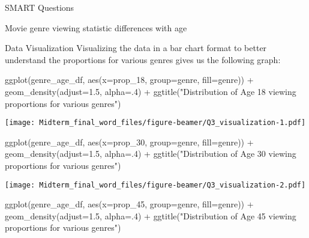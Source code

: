 \documentclass[
  ignorenonframetext,
]{beamer}
\newenvironment{Shaded}{\begin{snugshade}}{\end{snugshade}}
\newcommand{\AttributeTok}[1]{\textcolor[rgb]{0.77,0.63,0.00}{#1}}
\newcommand{\DecValTok}[1]{\textcolor[rgb]{0.00,0.00,0.81}{#1}}
\newcommand{\FloatTok}[1]{\textcolor[rgb]{0.00,0.00,0.81}{#1}}
\newcommand{\FunctionTok}[1]{\textcolor[rgb]{0.00,0.00,0.00}{#1}}
\newcommand{\NormalTok}[1]{#1}
\newcommand{\SpecialCharTok}[1]{\textcolor[rgb]{0.00,0.00,0.00}{#1}}
\newcommand{\StringTok}[1]{\textcolor[rgb]{0.31,0.60,0.02}{#1}}
\begin{document}
\begin{frame}[fragile]{SMART Questions}
\begin{block}{Movie genre viewing statistic differences with age}
\begin{block}{Data Visualization}
\protect\hypertarget{data-visualization-1}{}
Visualizing the data in a bar chart format to better understand the
proportions for various genres gives us the following graph:

\begin{Shaded}
\begin{Highlighting}[]
\FunctionTok{ggplot}\NormalTok{(genre\_age\_df, }\FunctionTok{aes}\NormalTok{(}\AttributeTok{x=}\NormalTok{prop\_18, }\AttributeTok{group=}\NormalTok{genre, }\AttributeTok{fill=}\NormalTok{genre)) }\SpecialCharTok{+}
  \FunctionTok{geom\_density}\NormalTok{(}\AttributeTok{adjust=}\FloatTok{1.5}\NormalTok{, }\AttributeTok{alpha=}\NormalTok{.}\DecValTok{4}\NormalTok{) }\SpecialCharTok{+}
      \FunctionTok{ggtitle}\NormalTok{(}\StringTok{"Distribution of Age 18 viewing proportions for various genres"}\NormalTok{)}
\end{Highlighting}
\end{Shaded}

\texttt{[image: Midterm\_final\_word\_files/figure-beamer/Q3\_visualization-1.pdf]}

\begin{Shaded}
\begin{Highlighting}[]
\FunctionTok{ggplot}\NormalTok{(genre\_age\_df, }\FunctionTok{aes}\NormalTok{(}\AttributeTok{x=}\NormalTok{prop\_30, }\AttributeTok{group=}\NormalTok{genre, }\AttributeTok{fill=}\NormalTok{genre)) }\SpecialCharTok{+}
  \FunctionTok{geom\_density}\NormalTok{(}\AttributeTok{adjust=}\FloatTok{1.5}\NormalTok{, }\AttributeTok{alpha=}\NormalTok{.}\DecValTok{4}\NormalTok{) }\SpecialCharTok{+}
      \FunctionTok{ggtitle}\NormalTok{(}\StringTok{"Distribution of Age 30 viewing proportions for various genres"}\NormalTok{)}
\end{Highlighting}
\end{Shaded}

\texttt{[image: Midterm\_final\_word\_files/figure-beamer/Q3\_visualization-2.pdf]}

\begin{Shaded}
\begin{Highlighting}[]
\FunctionTok{ggplot}\NormalTok{(genre\_age\_df, }\FunctionTok{aes}\NormalTok{(}\AttributeTok{x=}\NormalTok{prop\_45, }\AttributeTok{group=}\NormalTok{genre, }\AttributeTok{fill=}\NormalTok{genre)) }\SpecialCharTok{+}
  \FunctionTok{geom\_density}\NormalTok{(}\AttributeTok{adjust=}\FloatTok{1.5}\NormalTok{, }\AttributeTok{alpha=}\NormalTok{.}\DecValTok{4}\NormalTok{) }\SpecialCharTok{+}
      \FunctionTok{ggtitle}\NormalTok{(}\StringTok{"Distribution of Age 45 viewing proportions for various genres"}\NormalTok{)}
\end{Highlighting}
\end{Shaded}


\end{block}
\end{block}
\end{frame}
\end{document}
